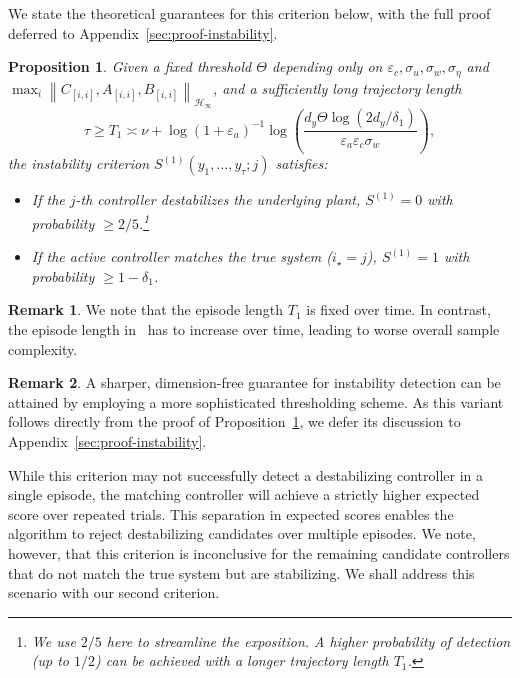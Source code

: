 \documentclass[11pt, twoside]{article}
\newtheorem{proposition}[theorem]{Proposition}
\theoremstyle{definition}
\newtheorem{remark}{Remark}
\newcommand{\norm}[1]{\left\lVert #1 \right\rVert}
\newcommand{\hinfnorm}[1]{\norm{#1}_{\mathcal{H}_\infty}}
\begin{document}
We state the theoretical guarantees for this criterion below, with the full proof deferred to Appendix~\ref{sec:proof-instability}.

\begin{proposition}
\label{thm:instability}
    Given a fixed threshold $\Theta$ depending only on $\varepsilon_c, \sigma_u, \sigma_w, \sigma_\eta$ and $\max_i \hinfnorm{C_{[i, i]}, A_{[i, i]}, B_{[i, i]}}$,
    and a sufficiently long trajectory length
    \[\tau \ge T_1 \asymp \nu + \log(1+\varepsilon_a)^{-1} \log\left(\frac{d_y \Theta \log(2d_y/\delta_1)}{\varepsilon_a \varepsilon_c \sigma_w}\right),\]
    the instability criterion $S^{(1)}(y_1, \dots, y_\tau; j)$ satisfies:
    \begin{itemize}[wide, labelindent=3pt]
    \item If the $j$-th controller destabilizes the underlying plant, $S^{(1)} = 0$ with probability $\ge 2/5$.\footnote{We use $2/5$ here to streamline the exposition. A higher probability of detection (up to $1/2$) can be achieved with a longer trajectory length $T_1$.}
    \item If the active controller matches the true system ($i_\star = j$), $S^{(1)} = 1$ with probability $\ge 1 - \delta_1$.
    \end{itemize}
\end{proposition}

\begin{remark}
We note that the episode length $T_1$ is fixed over time. In contrast, the episode length in~\cite{sun2024least} has to increase over time, leading to worse overall sample complexity.
\end{remark}

\begin{remark}
    A sharper, dimension-free guarantee for instability detection can be attained by employing a more sophisticated thresholding scheme.
    As this variant follows directly from the proof of Proposition~\ref{thm:instability}, we defer its discussion to Appendix~\ref{sec:proof-instability}.
\end{remark}

While this criterion may not successfully detect a destabilizing controller in a single episode, the matching controller will achieve a strictly higher expected score over repeated trials.
This separation in expected scores enables the algorithm to reject destabilizing candidates over multiple episodes.
We note, however, that this criterion is inconclusive for the remaining candidate controllers that do not match the true system but are stabilizing.
We shall address this scenario with our second criterion.
\end{document}
